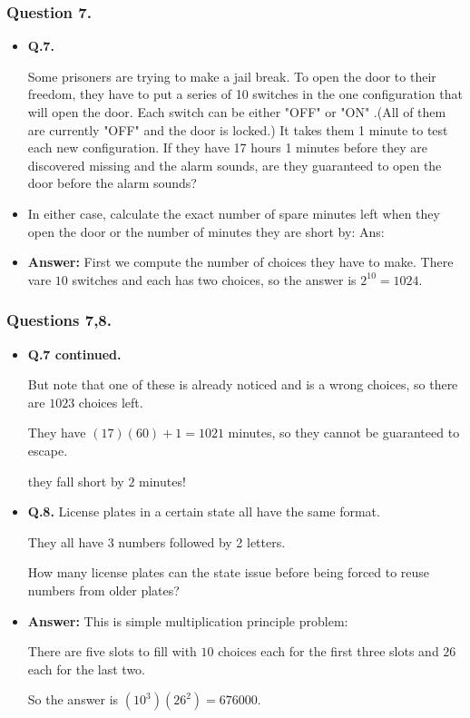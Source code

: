 %


\begin{frame}%
 \frametitle{Question 7.}
  \begin{itemize}%
 
\item {\bf Q.7.}

Some prisoners are trying to make a jail break.
To open the door to their freedom, they have to put a series of 10 switches
in the one configuration that will open the door.
Each switch can be either "OFF" or "ON" .(All of them are currently "OFF"
and the door is locked.)  It takes them 1 minute to test each new configuration.
If they have 17 hours 1 minutes before they are discovered missing and the alarm sounds,
are they guaranteed to open the door before the alarm sounds?
\item
In either case, calculate the exact number of spare minutes left when they open the
door or the number of minutes they are short by: Ans: 
        

\item {\bf Answer:} First we compute the number of choices they have to make. There vare $10$
switches and each has two choices, so the answer is $2^10=1024$.




               


\end{itemize}
\end{frame}

%





\begin{frame}%
 \frametitle{Questions 7,8.}
  \begin{itemize}%

\item {\bf Q.7 continued.}

But note that one of these is already noticed and is a wrong choices, so
there are $1023$ choices left.

They have $(17)(60)+1 = 1021$ minutes, so they cannot be guaranteed to
escape.

they fall short by $2$ minutes!


\item {\bf Q.8.}
License plates in a certain state all have the same format.

They all have 3 numbers  followed by 2 letters.

How many license plates can the state issue before being forced to reuse numbers
from older plates?

\item {\bf Answer:}
This is simple  multiplication principle problem:

There are five slots to fill with $10$ choices each for the first three
slots and $26$ each for the last two.

So the answer is $(10^3)(26^2) = 676000 $.



\end{itemize}
\end{frame}

